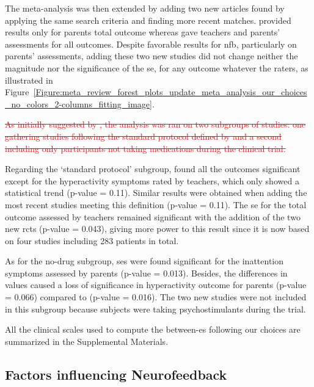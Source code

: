 The meta-analysis was then extended by adding two new articles \citep{Strehl2017, Baumeister2016} found 
by applying the same search criteria and finding more recent matches. \citet{Baumeister2016} provided results 
only for parents total outcome whereas \citet{Strehl2017} gave teachers and parents' assessments for all outcomes. 
Despite favorable results for \gls{nfb}, particularly on parents' assessments, adding these two new studies did not 
change neither the magnitude nor the significance of the \gls{se}, for any outcome whatever the raters,
as illustrated in Figure~\ref{Figure:meta_review_forest_plots_update_meta_analysis_our_choices_no_colors_2-columns_fitting_image}. 
 
\textcolor{red}{\sout{As initially suggested by \citeauthor{Cortese2016}, the analysis was ran on two subgroups of studies: one gathering 
studies following the standard protocol defined by \citet{Arns2014} and a second including only participants not taking medications 
during the clinical trial. }}

Regarding the `standard protocol' subgroup, \citet{Cortese2016} found all the outcomes significant except for the 
hyperactivity symptoms rated by teachers, which only showed a statistical trend (p-value = 0.11). Similar results 
were obtained when adding the most recent studies meeting this definition \citep{Strehl2017} (p-value = 0.11). 
The \gls{se} for the total outcome assessed by teachers remained significant with the addition of the two new
\glspl{rct} (p-value = 0.043), giving more power to this result since it is now based on four studies including 283
patients in total.

As for the no-drug subgroup, \glspl{se} were found significant for the inattention symptoms assessed by parents (p-value = 0.013). 
Besides, the differences in \citet{Arnold2014} values caused a loss of significance in hyperactivity outcome for parents 
(p-value = 0.066) compared to \citet{Cortese2016} (p-value = 0.016). The two new studies were not included in this 
subgroup because subjects were taking psychostimulants during the trial.

All the clinical scales used to compute the between-\gls{es} following our choices are summarized in the Supplemental Materials.

\subsection{Factors influencing Neurofeedback}

